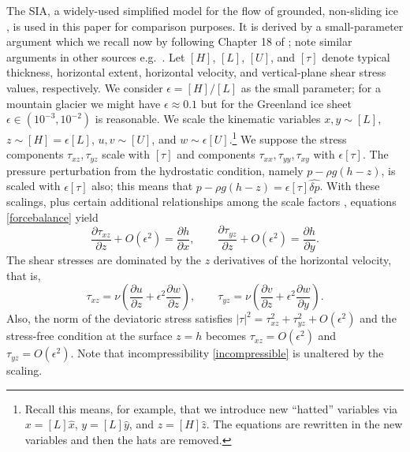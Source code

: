\documentclass[letterpaper,final,12pt,reqno]{amsart}
\newcommand{\eps}{\epsilon}
\begin{document}
The SIA, a widely-used simplified model for the flow of grounded, non-sliding ice \cite{SchoofHewitt2013}, is used in this paper for comparison purposes.  It is derived by a small-parameter argument which we recall now by following Chapter 18 of \cite{Fowler1997}; note similar arguments in other sources e.g.~\cite{GreveBlatter2009}.  Let $[H]$, $[L]$, $[U]$, and $[\tau]$ denote typical thickness, horizontal extent, horizontal velocity, and vertical-plane shear stress values, respectively.  We consider $\eps = [H]/[L]$ as the small parameter; for a mountain glacier we might have $\eps \approx 0.1$ but for the Greenland ice sheet $\eps \in (10^{-3},10^{-2})$ is reasonable.  We scale the kinematic variables $x,y \sim [L]$, $z \sim [H] = \eps [L]$, $u,v \sim [U]$, and $w \sim \eps [U]$.\footnote{Recall this means, for example, that we introduce new ``hatted'' variables via $x=[L]\hat x$, $y=[L]\hat y$, and $z=[H] \hat z$.  The equations are rewritten in the new variables and then the hats are removed.}  We suppose the stress components $\tau_{xz},\tau_{yz}$ scale with $[\tau]$ and components $\tau_{xx},\tau_{yy},\tau_{xy}$ with $\eps[\tau]$.   The pressure perturbation from the hydrostatic condition, namely $p-\rho g (h - z)$, is scaled with $\eps [\tau]$ also; this means that $p-\rho g (h - z)=\eps[\tau]\hat{\delta p}$.  With these scalings, plus certain additional relationships among the scale factors \cite[Chapter 18]{Fowler1997}, equations \eqref{forcebalance} yield
    $$\frac{\partial\tau_{xz}}{\partial z} + O(\eps^2) = \frac{\partial h}{\partial x}, \qquad \frac{\partial\tau_{yz}}{\partial z} + O(\eps^2) = \frac{\partial h}{\partial y}.$$
The shear stresses are dominated by the $z$ derivatives of the horizontal velocity, that is,
    $$\tau_{xz} = \nu\left(\frac{\partial u}{\partial z} + \eps^2 \frac{\partial w}{\partial z}\right), \qquad \tau_{yz} = \nu\left(\frac{\partial v}{\partial z} + \eps^2 \frac{\partial w}{\partial y}\right).$$
Also, the norm of the deviatoric stress satisfies $|\tau|^2 = \tau_{xz}^2 + \tau_{yz}^2 + O(\eps^2)$ and the stress-free condition at the surface $z=h$ becomes $\tau_{xz} = O(\eps^2)$ and $\tau_{yz} = O(\eps^2)$.  Note that incompressibility \eqref{incompressible} is unaltered by the scaling.
\end{document}
